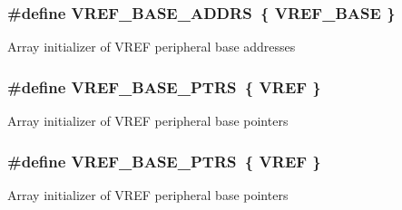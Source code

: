 \subsubsection[{\texorpdfstring{V\+R\+E\+F\+\_\+\+B\+A\+S\+E\+\_\+\+A\+D\+D\+RS}{VREF_BASE_ADDRS}}]{\setlength{\rightskip}{0pt plus 5cm}\#define V\+R\+E\+F\+\_\+\+B\+A\+S\+E\+\_\+\+A\+D\+D\+RS~\{ {\bf V\+R\+E\+F\+\_\+\+B\+A\+SE} \}}\hypertarget{group__VREF__Peripheral__Access__Layer_gac0ccacace16937d7109589180bb2650b}{}\label{group__VREF__Peripheral__Access__Layer_gac0ccacace16937d7109589180bb2650b}
Array initializer of V\+R\+EF peripheral base addresses 
\subsubsection[{\texorpdfstring{V\+R\+E\+F\+\_\+\+B\+A\+S\+E\+\_\+\+P\+T\+RS}{VREF_BASE_PTRS}}]{\setlength{\rightskip}{0pt plus 5cm}\#define V\+R\+E\+F\+\_\+\+B\+A\+S\+E\+\_\+\+P\+T\+RS~\{ {\bf V\+R\+EF} \}}\hypertarget{group__VREF__Peripheral__Access__Layer_ga3eb17aee5de4a519ee18fe763e43865b}{}\label{group__VREF__Peripheral__Access__Layer_ga3eb17aee5de4a519ee18fe763e43865b}
Array initializer of V\+R\+EF peripheral base pointers 
\subsubsection[{\texorpdfstring{V\+R\+E\+F\+\_\+\+B\+A\+S\+E\+\_\+\+P\+T\+RS}{VREF_BASE_PTRS}}]{\setlength{\rightskip}{0pt plus 5cm}\#define V\+R\+E\+F\+\_\+\+B\+A\+S\+E\+\_\+\+P\+T\+RS~\{ {\bf V\+R\+EF} \}}\hypertarget{group__VREF__Peripheral__Access__Layer_ga3eb17aee5de4a519ee18fe763e43865b}{}\label{group__VREF__Peripheral__Access__Layer_ga3eb17aee5de4a519ee18fe763e43865b}
Array initializer of V\+R\+EF peripheral base pointers 